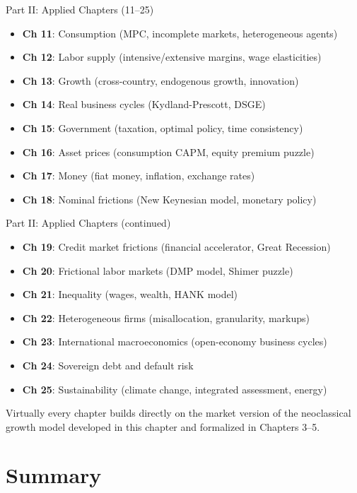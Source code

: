 \documentclass[blue]{beamer}
\begin{document}
\begin{frame}{Part II: Applied Chapters (11--25)}
	\begin{itemize}
		\item \textbf{Ch 11}: Consumption (MPC, incomplete markets, heterogeneous agents)
		\item \textbf{Ch 12}: Labor supply (intensive/extensive margins, wage elasticities)
		\item \textbf{Ch 13}: Growth (cross-country, endogenous growth, innovation)
		\item \textbf{Ch 14}: Real business cycles (Kydland-Prescott, DSGE)
		\item \textbf{Ch 15}: Government (taxation, optimal policy, time consistency)
		\item \textbf{Ch 16}: Asset prices (consumption CAPM, equity premium puzzle)
		\item \textbf{Ch 17}: Money (fiat money, inflation, exchange rates)
		\item \textbf{Ch 18}: Nominal frictions (New Keynesian model, monetary policy)
	\end{itemize}
\end{frame}

\begin{frame}{Part II: Applied Chapters (continued)}
	\begin{itemize}
		\item \textbf{Ch 19}: Credit market frictions (financial accelerator, Great Recession)
		\item \textbf{Ch 20}: Frictional labor markets (DMP model, Shimer puzzle)
		\item \textbf{Ch 21}: Inequality (wages, wealth, HANK model)
		\item \textbf{Ch 22}: Heterogeneous firms (misallocation, granularity, markups)
		\item \textbf{Ch 23}: International macroeconomics (open-economy business cycles)
		\item \textbf{Ch 24}: Sovereign debt and default risk
		\item \textbf{Ch 25}: Sustainability (climate change, integrated assessment, energy)
	\end{itemize}
	Virtually every chapter builds directly on the market version of the neoclassical growth model developed in this chapter and formalized in Chapters 3--5.
\end{frame}
\section{Summary}
\end{document}
